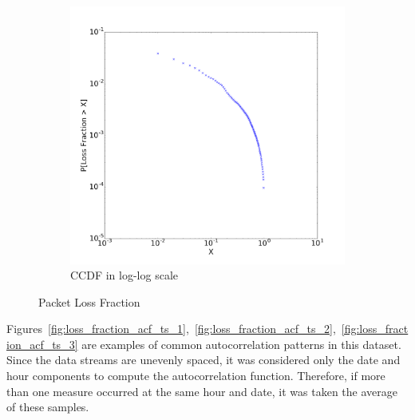 \begin{figure}[H]
{\begin{subfigure}[b]{0.55\textwidth}
            \includegraphics[width=\linewidth]{./figures/dataset/ts/ccdf.png}
            \caption{CCDF in log-log scale}
        \end{subfigure}
    }
    \caption{Packet Loss Fraction}
    \label{fig:loss_fraction_cdf_ccdf}
\end{figure}%

Figures~\ref{fig:loss_fraction_acf_ts_1},~\ref{fig:loss_fraction_acf_ts_2},~\ref{fig:loss_fraction_acf_ts_3} are examples of common autocorrelation patterns in this dataset. Since the data streams are unevenly spaced, it was considered only the date and hour components to compute the autocorrelation function. Therefore, if more than one measure occurred at the same hour and date, it was taken the average of these samples.

